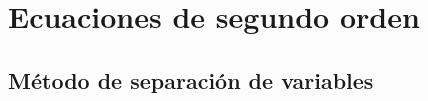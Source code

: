 \chapter{Ecuaciones de segundo orden}
\label{chap:EcuacionesSegundoOrden}

\section{Método de separación de variables}